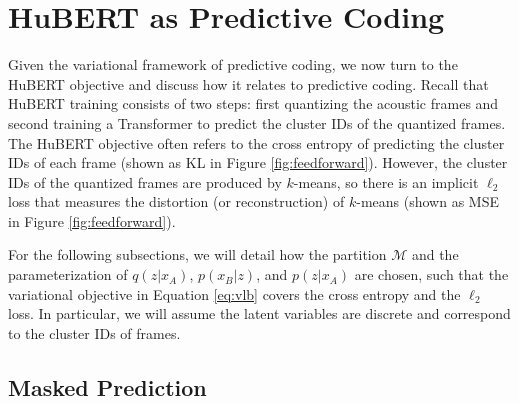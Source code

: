 \documentclass[11pt,a4paper]{article}
\begin{document}
%
%
%
%
%
%
%
%
%
%
%
%
%
%
%
%
%
%
%
%
%
%
%
%
%
%
%
%
%
%

%
%
%
%
%
%
%
%
%
%
%
%
%
%
%
%
%
%

%
%
%
%
%
%
%
%
%
%
%
%
%

%
%
%
%

%
%
%
%
%
%
%
%
%
%
%
%
%
%
%
%
%
%
%
%
%
%
%
%
%
%
%
%
%
%
%
%
%
%
%
%
%
%
%
%
%
%

\section{HuBERT as Predictive Coding}
\label{sec:hubert}

Given the variational framework of predictive coding, we now turn to the HuBERT objective and discuss how it relates to predictive coding.
Recall that HuBERT training consists of two steps:
first quantizing the acoustic frames and second training a
Transformer to predict the cluster IDs of the quantized frames.
The HuBERT objective often refers to the cross entropy of predicting
the cluster IDs of each frame (shown as KL in Figure \ref{fig:feedforward}).
However, the cluster IDs of the quantized frames are produced by $k$-means,
so there is an implicit $\ell_2$ loss that measures
the distortion (or reconstruction) of $k$-means
(shown as MSE in Figure \ref{fig:feedforward}).

For the following subsections, we will detail how
the partition $\mathcal{M}$ and the parameterization of $q(z|x_A)$,
$p(x_B | z)$, and $p(z|x_A)$ are chosen, such that
the variational objective in Equation \ref{eq:vlb}
covers the cross entropy and the $\ell_2$ loss.
In particular, we will assume the latent variables are discrete
and correspond to the cluster IDs of frames.
%
%

\subsection{Masked Prediction}
\label{methods:mlm}
\end{document}
